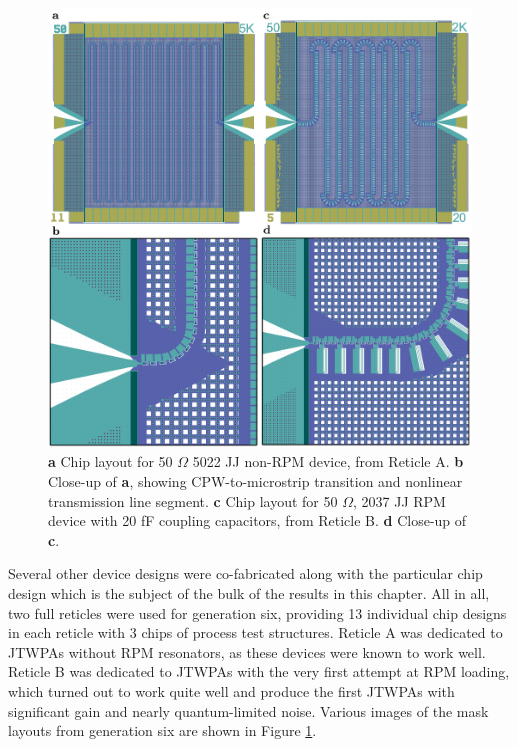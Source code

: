 \begin{figure}
\begin{center}
\includegraphics[width=6in]{twpa_exp/masks.png}
\end{center}
\caption[Example JTWPA layout masks]{\textbf{a} Chip layout for 50 $\Omega$ 5022 JJ non-RPM device, from Reticle A. \textbf{b} Close-up of \textbf{a}, showing CPW-to-microstrip transition and nonlinear transmission line segment. \textbf{c} Chip layout for 50 $\Omega$, 2037 JJ RPM device with 20 fF coupling capacitors, from Reticle B. \textbf{d} Close-up of \textbf{c}.}
\label{fig:masks}
\end{figure}

Several other device designs were co-fabricated along with the particular chip design which is the subject of the bulk of the results in this chapter.  All in all, two full reticles were used for generation six, providing 13 individual chip designs in each reticle with 3 chips of process test structures.  Reticle A was dedicated to JTWPAs without RPM resonators, as these devices were known to work well.  Reticle B was dedicated to JTWPAs with the very first attempt at RPM loading, which turned out to work quite well and produce the first JTWPAs with significant gain and nearly quantum-limited noise.  Various images of the mask layouts from generation six are shown in Figure \ref{fig:masks}.

